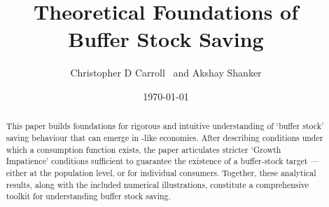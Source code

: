 \documentclass[BufferStockTheory]{subfiles}
\begin{document}



\title{Theoretical Foundations of \\ Buffer Stock Saving}

\author{Christopher D Carroll         ~and Akshay Shanker}



\date{\today}

\maketitle
\hypertarget{abstract}{}
\begin{abstract}
  This paper builds foundations for rigorous and intuitive understanding of `buffer stock' saving behaviour that can emerge in \cite{bewleyPIH}-like economies.
  After describing conditions under which a consumption function exists, the paper articulates stricter `Growth Impatience' conditions sufficient to guarantee the existence of a buffer-stock target --- either at the population level, or for individual consumers.
  Together, these analytical results, along with the included numerical illustrations, constitute a comprehensive toolkit for understanding buffer stock saving.
\end{abstract}

\hypertarget{links}{}
\end{document}
